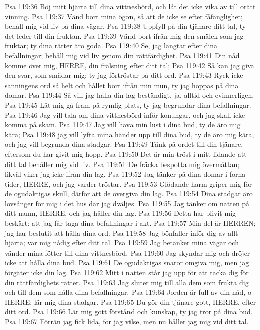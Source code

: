 Psa 119:36  Böj mitt hjärta till dina vittnesbörd, och låt det icke vika av till orätt vinning.
Psa 119:37  Vänd bort mina ögon, så att de icke se efter fåfänglighet; behåll mig vid liv på dina vägar.
Psa 119:38  Uppfyll på din tjänare ditt tal, ty det leder till din fruktan.
Psa 119:39  Vänd bort ifrån mig den smälek som jag fruktar; ty dina rätter äro goda.
Psa 119:40  Se, jag längtar efter dina befallningar; behåll mig vid liv genom din rättfärdighet.
Psa 119:41  Din nåd komme över mig, HERRE, din frälsning efter ditt tal;
Psa 119:42  Så kan jag giva den svar, som smädar mig; ty jag förtröstar på ditt ord.
Psa 119:43  Ryck icke sanningens ord så helt och hållet bort ifrån min mun, ty jag hoppas på dina domar.
Psa 119:44  Så vill jag hålla din lag beständigt, ja, alltid och evinnerligen.
Psa 119:45  Låt mig gå fram på rymlig plats, ty jag begrundar dina befallningar.
Psa 119:46  Jag vill tala om dina vittnesbörd inför konungar, och jag skall icke komma på skam.
Psa 119:47  Jag vill hava min lust i dina bud, ty de äro mig kära;
Psa 119:48  jag vill lyfta mina händer upp till dina bud, ty de äro mig kära, och jag vill begrunda dina stadgar.
Psa 119:49  Tänk på ordet till din tjänare, eftersom du har givit mig hopp.
Psa 119:50  Det är min tröst i mitt lidande att ditt tal behåller mig vid liv.
Psa 119:51  De fräcka bespotta mig övermåttan; likväl viker jag icke ifrån din lag.
Psa 119:52  Jag tänker på dina domar i forna tider, HERRE, och jag varder tröstar.
Psa 119:53  Glödande harm griper mig för de ogudaktigas skull, därför att de övergiva din lag.
Psa 119:54  Dina stadgar äro lovsånger för mig i det hus där jag dväljes.
Psa 119:55  Jag tänker om natten på ditt namn, HERRE, och jag håller din lag.
Psa 119:56  Detta har blivit mig beskärt: att jag får taga dina befallningar i akt.
Psa 119:57  Min del är HERREN; jag har beslutit att hålla dina ord.
Psa 119:58  Jag bönfaller inför dig av allt hjärta; var mig nådig efter ditt tal.
Psa 119:59  Jag betänker mina vägar och vänder mina fötter till dina vittnesbörd.
Psa 119:60  Jag skyndar mig och dröjer icke att hålla dina bud.
Psa 119:61  De ogudaktigas snaror omgiva mig, men jag förgäter icke din lag.
Psa 119:62  Mitt i natten står jag upp för att tacka dig för din rättfärdighets rätter.
Psa 119:63  Jag sluter mig till alla dem som frukta dig och till dem som hålla dina befallningar.
Psa 119:64  Jorden är full av din nåd, o HERRE; lär mig dina stadgar.
Psa 119:65  Du gör din tjänare gott, HERRE, efter ditt ord.
Psa 119:66  Lär mig gott förstånd och kunskap, ty jag tror på dina bud.
Psa 119:67  Förrän jag fick lida, for jag vilse, men nu håller jag mig vid ditt tal.
